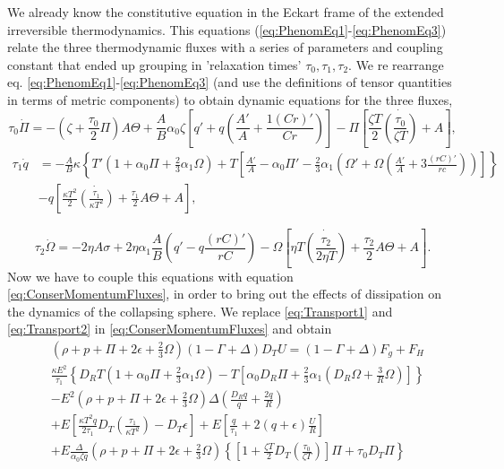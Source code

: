 We already know the constitutive equation in the Eckart frame of the extended irreversible thermodynamics. This equations (\ref{eq:PhenomEq1}-\ref{eq:PhenomEq3}) relate the three thermodynamic fluxes with a series of parameters and coupling constant that ended up grouping in 'relaxation times' $\tau_0, \tau_1, \tau_2$. We re rearrange eq. \ref{eq:PhenomEq1}-\ref{eq:PhenomEq3} (and use the definitions of tensor quantities in terms of metric components) to obtain dynamic equations for the three fluxes, 
\begin{equation}
\label{eq:Transport1}
	\tau_0 \dot{\Pi} = -\left(\zeta + \frac{\tau_0}{2}\Pi\right)A\Theta + \frac{A}{B} \alpha_0 \zeta \left[q' + q\left(\frac{A'}{A} + \frac{1(Cr)'}{Cr}\right)\right] - \Pi\left[\frac{\zeta T}{2}\dot{\left(\frac{\tau_0}{\zeta T}\right)} + A\right],
\end{equation} 
\begin{align}
	\label{eq:Transport2}
	\tau_1 \dot{q} &= -\frac{A}{B}\kappa \left\{ T' \left(1 + \alpha_0 \Pi + \frac{2}{3} \alpha_1 \Omega\right) + T\left[\frac{A'}{A} - \alpha_0 \Pi' - \frac{2}{3} \alpha_1 \left(\Omega' + \Omega\left(\frac{A'}{A} + 3\frac{(rC)'}{rc}\right)\right)\right]  \right\} \\\nonumber 
	&- q\left[\frac{\kappa T^2}{2}\dot{\left(\frac{\tau_1}{\kappa T^2} \right)} + \frac{\tau_1}{2}A\Theta + A\right],
\end{align}

\begin{equation}
	\label{eq:Transport3}
	\tau_2 \dot{\Omega} = -2\eta A\sigma + 2 \eta\alpha_1 \frac{A}{B} \left(q' - q\frac{(rC)'}{rC}\right) - \Omega \left[\eta T \dot{\left(\frac{\tau_2}{2\eta T}\right)} + \frac{\tau_2}{2}A\Theta + A\right].
\end{equation}
Now we have to couple this equations with equation \ref{eq:ConserMomentumFluxes}, in order to bring out the effects of dissipation on the dynamics of the collapsing sphere. We replace \ref{eq:Transport1} and \ref{eq:Transport2} in \ref{eq:ConserMomentumFluxes} and obtain \cite{herrera2009dynamics}
\begin{align}
\nonumber
	&\left(\rho + p + \Pi + 2\epsilon + \frac{2}{3}\Omega\right)(1 - \Gamma + \Delta) D_T U = (1-\Gamma + \Delta)F_{g} + F_{H} \\\nonumber
	&\frac{\kappa E^2}{\tau_1} \left\{ D_R T\left(1 + \alpha_0\Pi + \frac{2}{3}\alpha_1 \Omega\right)- T\left[\alpha_0 D_R\Pi + \frac{2}{3}\alpha_1\left(D_R \Omega + \frac{3}{R}\Omega\right)\right] \right\} \\\nonumber
	&-E^2\left(\rho + p + \Pi + 2 \epsilon + \frac{2}{3} \Omega\right)\Delta\left(\frac{D_R q}{q} + \frac{2q}{R}\right)\\\nonumber
	&+ E\left[\frac{\kappa T^2 q}{2\tau_1}D_T \left(\frac{\tau_1}{\kappa T^2}\right) - D_T \epsilon\right] + E\left[\frac{q}{\tau_1} + 2(q+\epsilon)\frac{U}{R}\right] \\
	\label{eq:MasterEquationTesis}
	&+E\frac{\Delta}{\alpha_0 \zeta q} \left(\rho + p + \Pi + 2\epsilon + \frac{2}{3} \Omega\right)\left\{ \left[1 + \frac{\zeta T}{2}D_T \left(\frac{\tau_0}{\zeta T}\right) \right]\Pi + \tau_0 D_T \Pi \right\}
\end{align}

